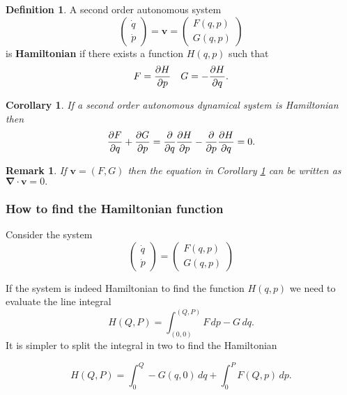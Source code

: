 \documentclass[12pt, a4paper]{article}
\newtheorem*{remark}{Remark}
\theoremstyle{definition}
\newtheorem{definition}{Definition}[section]
\theoremstyle{plain}
\newtheorem{corollary}{Corollary}[theorem]
\begin{document}
\begin{definition}
A second order autonomous system $$\begin{pmatrix} \dot{q} \\ \dot{p} \end{pmatrix} =\bm{v} =\begin{pmatrix} F(q,p) \\ G(q,p) \end{pmatrix}$$ is \textbf{Hamiltonian} if there exists a function $H(q,p)$ such that $$F=\pdv{H}{p} \quad G=-\pdv{H}{q}.$$
\end{definition}

\begin{corollary}\label{cor:Hamiltonian test}
If a second order autonomous dynamical system is Hamiltonian then $$\pdv{F}{q}+\pdv{G}{p}=\pdv{}{q}\pdv{H}{p}-\pdv{}{p}\pdv{H}{q}=0.$$
\end{corollary}

\begin{remark}
If $\bm{v}=(F,G)$ then the equation in Corollary \ref{cor:Hamiltonian test} can be written as $\bm{\nabla \cdot v}=0.$
\end{remark}

\subsubsection{How to find the Hamiltonian function}

Consider the system $$\begin{pmatrix} \dot{q} \\ \dot{p} \end{pmatrix} =\begin{pmatrix} F(q,p) \\ G(q,p) \end{pmatrix}$$

If the system is indeed Hamiltonian to find the function $H(q,p)$ we need to evaluate the line integral $$H(Q,P)=\int_{(0,0)}^{(Q,P)} F \, dp -G \, dq.$$ It is simpler to split the integral in two to find the Hamiltonian \begin{tcolorbox}
$$H(Q,P)=\int_0^Q -G(q,0) \, dq +\int_0^P F(Q,p) \, dp.$$
\end{tcolorbox}
\end{document}
